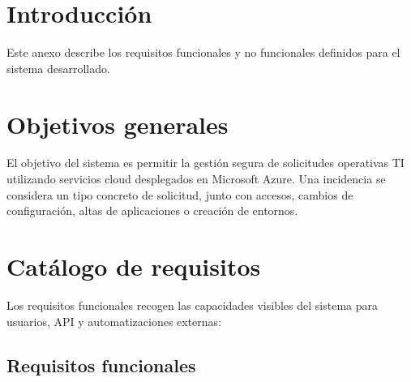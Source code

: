 
\section{Introducción}

Este anexo describe los requisitos funcionales y no funcionales definidos para el sistema desarrollado.

\section{Objetivos generales}

El objetivo del sistema es permitir la gestión segura de solicitudes operativas TI utilizando servicios cloud desplegados en Microsoft Azure. Una incidencia se considera un tipo concreto de solicitud, junto con accesos, cambios de configuración, altas de aplicaciones o creación de entornos.

\section{Catálogo de requisitos}

Los requisitos funcionales recogen las capacidades visibles del sistema para usuarios, API y automatizaciones externas:

\subsection{Requisitos funcionales}

